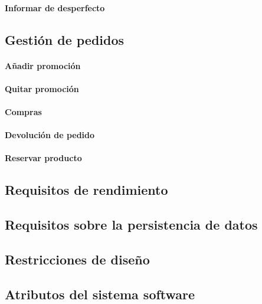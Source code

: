 \paragraph{Informar de desperfecto}
\subsection{Gestión de pedidos}
\paragraph{Añadir promoción}
\paragraph{Quitar promoción}
\paragraph{Compras}
\paragraph{Devolución de pedido}
\paragraph{Reservar producto}
\subsection{Requisitos de rendimiento}
\subsection{Requisitos sobre la persistencia de datos}
\subsection{Restricciones de diseño}
\subsection{Atributos del sistema software}
